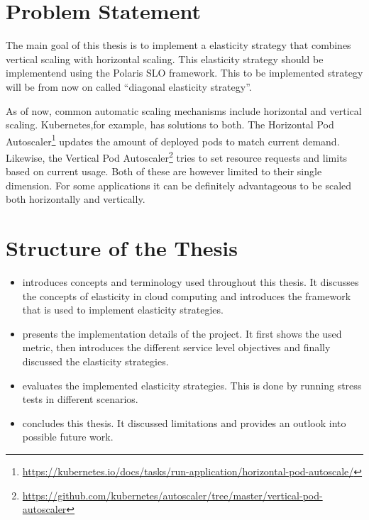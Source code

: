\section{Problem Statement}
\label{sec:problem-statement}

The main goal of this thesis is to implement a elasticity strategy that combines vertical scaling with horizontal scaling. This elasticity strategy should be implementend using the Polaris SLO framework. This to be implemented strategy will be from now on called ``diagonal elasticity strategy''.

As of now, common automatic scaling mechanisms include horizontal and vertical scaling. Kubernetes,for example, has solutions to both. The Horizontal Pod Autoscaler\footnote{\raggedright\url{https://kubernetes.io/docs/tasks/run-application/horizontal-pod-autoscale/}} updates the amount of deployed pods to match current demand. Likewise, the Vertical Pod Autoscaler\footnote{\raggedright\url{https://github.com/kubernetes/autoscaler/tree/master/vertical-pod-autoscaler}} tries to set resource requests and limits based on current usage. Both of these are however limited to their single dimension. For some applications it can be definitely advantageous to be scaled both horizontally and vertically.

\section{Structure of the Thesis}
\label{sec:structure}

\begin{itemize}
    \item {} introduces concepts and terminology used throughout this thesis. It discusses the concepts of elasticity in cloud computing and introduces the framework that is used to implement elasticity strategies.

    \item {} presents the implementation details of the project. It first shows the used metric, then introduces the different service level objectives and finally discussed the elasticity strategies.

    \item {} evaluates the implemented elasticity strategies. This is done by running stress tests in different scenarios.

    \item {} concludes this thesis. It discussed limitations and provides an outlook into possible future work.
\end{itemize}
